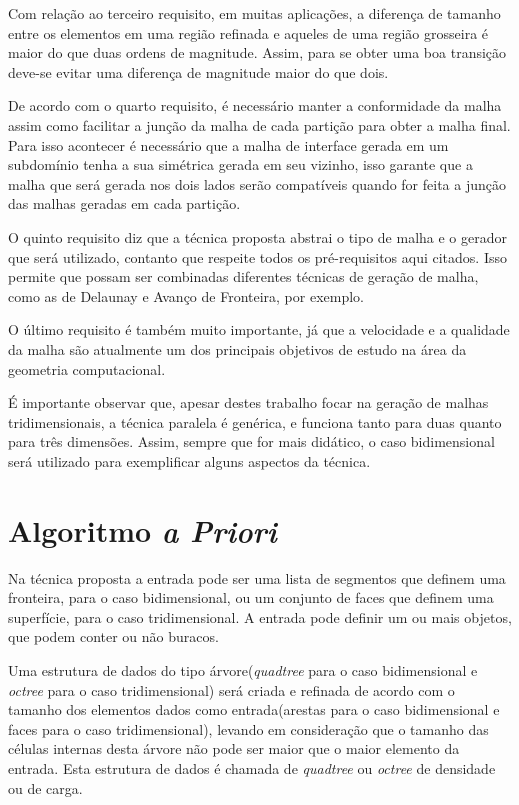 Com relação ao terceiro requisito, em muitas aplicações, a diferença de tamanho entre os elementos em uma região refinada e aqueles de uma região grosseira é maior do que duas ordens de magnitude. Assim, para se obter uma boa transição deve-se evitar uma diferença de magnitude maior do que dois.

De acordo com o quarto requisito, é necessário manter a conformidade da malha assim como facilitar a junção da malha de cada partição para obter a malha final. Para isso acontecer é necessário que a malha de interface gerada em um subdomínio tenha a sua simétrica gerada em seu vizinho, isso garante que a malha que será gerada nos dois lados serão compatíveis quando for feita a junção das malhas geradas em cada partição.

O quinto requisito diz que a técnica proposta abstrai o tipo de malha e o gerador que será utilizado, contanto que respeite todos os pré-requisitos aqui citados. Isso permite que possam ser combinadas diferentes técnicas de geração de malha, como as de Delaunay e Avanço de Fronteira, por exemplo.

O último requisito é também muito importante, já que a velocidade e a qualidade da malha são atualmente um dos principais objetivos de estudo na área da geometria computacional.

É importante observar que, apesar destes trabalho focar na geração de malhas tridimensionais, a técnica paralela é genérica, e funciona tanto para duas quanto para três dimensões. Assim, sempre que for mais didático, o caso bidimensional será utilizado para exemplificar alguns aspectos da técnica.



\section{Algoritmo \textit{a Priori}}

Na técnica proposta a entrada pode ser uma lista de segmentos que definem uma fronteira, para o caso bidimensional, ou um conjunto de faces que definem uma superfície, para o caso tridimensional. A entrada pode definir um ou mais objetos, que podem conter ou não buracos. 

Uma estrutura de dados do tipo árvore(\textit{quadtree} para o caso bidimensional e \textit{octree} para o caso tridimensional) será criada e refinada de acordo com o tamanho dos elementos dados como entrada(arestas para o caso bidimensional e faces para o caso tridimensional), levando em consideração que o tamanho das células internas desta árvore não pode ser maior que o maior elemento da entrada. Esta estrutura de dados é chamada de \textit{quadtree} ou \textit{octree} de densidade ou de carga.

